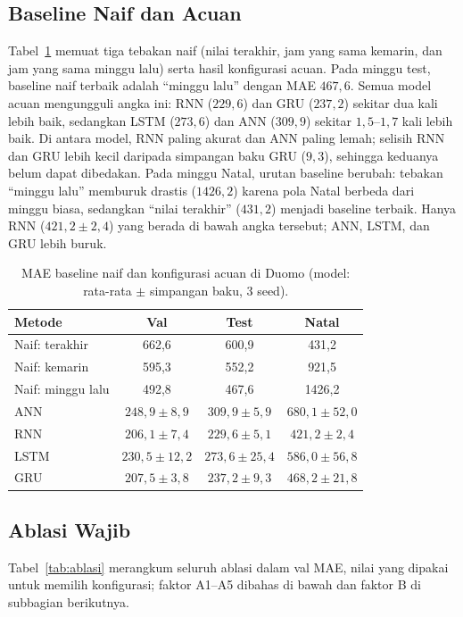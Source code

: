 \documentclass[conference,a4paper]{IEEEtran}
\begin{document}
\subsection{Baseline Naif dan Acuan}
Tabel~\ref{tab:naif} memuat tiga tebakan naif (nilai terakhir, jam yang sama kemarin, dan jam yang sama minggu lalu) serta hasil konfigurasi acuan. Pada minggu test, baseline naif terbaik adalah ``minggu lalu'' dengan MAE $467{,}6$. Semua model acuan mengungguli angka ini: RNN ($229{,}6$) dan GRU ($237{,}2$) sekitar dua kali lebih baik, sedangkan LSTM ($273{,}6$) dan ANN ($309{,}9$) sekitar $1{,}5$--$1{,}7$ kali lebih baik. Di antara model, RNN paling akurat dan ANN paling lemah; selisih RNN dan GRU lebih kecil daripada simpangan baku GRU ($9{,}3$), sehingga keduanya belum dapat dibedakan. Pada minggu Natal, urutan baseline berubah: tebakan ``minggu lalu'' memburuk drastis ($1426{,}2$) karena pola Natal berbeda dari minggu biasa, sedangkan ``nilai terakhir'' ($431{,}2$) menjadi baseline terbaik. Hanya RNN ($421{,}2 \pm 2{,}4$) yang berada di bawah angka tersebut; ANN, LSTM, dan GRU lebih buruk.

\begin{table}[t]
  \centering
  \caption{MAE baseline naif dan konfigurasi acuan di Duomo (model: rata-rata $\pm$ simpangan baku, 3 seed).}
  \label{tab:naif}
  \footnotesize
  \setlength{\tabcolsep}{3pt}
  \begin{tabular}{@{}lccc@{}}
    \toprule
    Metode & Val & Test & Natal \\
    \midrule
    Naif: terakhir    & 662,6 & 600,9 & 431,2 \\
    Naif: kemarin     & 595,3 & 552,2 & 921,5 \\
    Naif: minggu lalu & 492,8 & 467,6 & 1426,2 \\
    \midrule
    ANN  & $248{,}9 \pm 8{,}9$  & $309{,}9 \pm 5{,}9$  & $680{,}1 \pm 52{,}0$ \\
    RNN  & $206{,}1 \pm 7{,}4$  & $229{,}6 \pm 5{,}1$  & $421{,}2 \pm 2{,}4$ \\
    LSTM & $230{,}5 \pm 12{,}2$ & $273{,}6 \pm 25{,}4$ & $586{,}0 \pm 56{,}8$ \\
    GRU  & $207{,}5 \pm 3{,}8$  & $237{,}2 \pm 9{,}3$  & $468{,}2 \pm 21{,}8$ \\
    \bottomrule
  \end{tabular}
\end{table}

\subsection{Ablasi Wajib}
Tabel~\ref{tab:ablasi} merangkum seluruh ablasi dalam val MAE, nilai yang dipakai untuk memilih konfigurasi; faktor A1--A5 dibahas di bawah dan faktor B di subbagian berikutnya.
\end{document}
